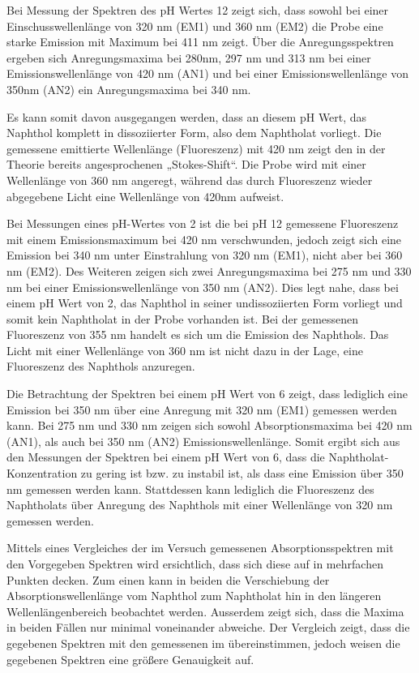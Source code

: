 \documentclass[12pt]{article}
\begin{document}
Bei Messung der Spektren des pH Wertes 12 zeigt sich, dass sowohl bei einer Einschusswellenlänge von 320 nm (EM1) und
360 nm (EM2) die Probe eine starke Emission mit Maximum bei 411 nm zeigt. Über die Anregungsspektren
ergeben sich Anregungsmaxima bei 280nm, 297 nm und 313 nm bei einer Emissionswellenlänge von 420 nm (AN1)
und bei einer Emissionswellenlänge von 350nm (AN2) ein Anregungsmaxima bei 340 nm.

Es kann somit davon ausgegangen werden, dass an diesem pH Wert, das Naphthol komplett in dissoziierter Form, also dem Naphtholat vorliegt.
Die gemessene emittierte Wellenlänge (Fluoreszenz) mit 420 nm zeigt den in der Theorie bereits angesprochenen „Stokes-Shift“.
Die Probe wird mit einer Wellenlänge von 360 nm angeregt, während das durch Fluoreszenz wieder abgegebene
Licht eine Wellenlänge von 420nm aufweist.


Bei Messungen eines pH-Wertes von 2 ist die bei pH 12 gemessene Fluoreszenz mit einem Emissionsmaximum bei 420 nm verschwunden,
jedoch zeigt sich eine Emission bei 340 nm unter Einstrahlung von 320 nm (EM1), nicht aber bei 360 nm (EM2).
Des Weiteren zeigen sich zwei Anregungsmaxima bei 275 nm und 330 nm bei einer Emissionswellenlänge von 350 nm (AN2).
Dies legt nahe, dass bei einem pH Wert von 2, das Naphthol in seiner undissoziierten Form vorliegt
und somit kein Naphtholat in der Probe vorhanden ist. Bei der gemessenen Fluoreszenz von 355 nm handelt
es sich um die Emission des Naphthols. Das Licht mit einer Wellenlänge von 360 nm ist nicht dazu in der Lage,
eine Fluoreszenz des Naphthols anzuregen.


Die Betrachtung der Spektren bei einem pH Wert von 6 zeigt, dass lediglich eine Emission bei 350 nm
über eine Anregung mit 320 nm (EM1) gemessen werden kann. Bei 275 nm und 330 nm zeigen sich sowohl Absorptionsmaxima bei 420 nm (AN1),
als auch bei 350 nm (AN2) Emissionswellenlänge.
Somit ergibt sich aus den Messungen der Spektren bei einem pH Wert von 6,
dass die Naphtholat-Konzentration zu gering ist bzw. zu instabil ist,
als dass eine Emission über 350 nm gemessen werden kann.
Stattdessen kann lediglich die Fluoreszenz des Naphtholats
über Anregung des Naphthols mit einer Wellenlänge von 320 nm gemessen werden.


Mittels eines Vergleiches der im Versuch gemessenen Absorptionsspektren mit den Vorgegeben Spektren wird ersichtlich,
dass sich diese auf in mehrfachen Punkten decken. Zum einen kann in beiden die Verschiebung der Absorptionswellenlänge
vom Naphthol zum Naphtholat hin in den längeren Wellenlängenbereich beobachtet werden. Ausserdem zeigt sich,
dass die Maxima in beiden Fällen nur minimal voneinander abweiche.
Der Vergleich zeigt, dass die gegebenen Spektren mit den gemessenen im übereinstimmen,
jedoch weisen die gegebenen Spektren eine größere Genauigkeit auf.

\printbibliography
\end{document}
